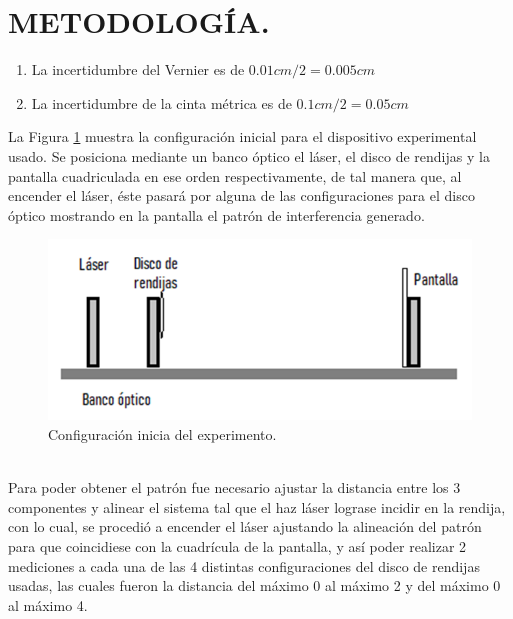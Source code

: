 \documentclass[12pt,a4paper]{article}
\begin{document}
\newpage
\section{METODOLOGÍA.} %
\begin{enumerate}[noitemsep]
	\item La incertidumbre del Vernier es de $ 0.01cm/2=0.005 cm $
	\item La incertidumbre de la cinta métrica es de $ 0.1cm/2=0.05 cm $
\end{enumerate}
La Figura \ref{fig:conf_inicial} muestra la configuración inicial para el dispositivo experimental usado.
Se posiciona mediante un banco óptico el láser, el disco de rendijas y la pantalla cuadriculada en ese orden respectivamente, de tal manera que, al encender el láser, éste pasará por alguna de las configuraciones para el disco óptico mostrando en la pantalla el patrón de interferencia generado.
\begin{figure}[hbtp!]
	\centering
	\includegraphics[width= 0.7 \linewidth]{2_METODO/image}
	\caption{Configuración inicia del experimento.}
	\label{fig:conf_inicial}
\end{figure}\\
Para poder obtener el patrón fue necesario ajustar la distancia entre los 3 componentes y alinear el sistema tal que el haz láser lograse incidir en la rendija, con lo cual, se procedió a encender el láser ajustando la alineación del patrón para que coincidiese con la cuadrícula de la pantalla, y así poder realizar 2 mediciones a cada una de las 4 distintas configuraciones del disco de rendijas usadas, las cuales fueron la distancia del máximo 0 al máximo 2 y del máximo 0 al máximo 4.
\end{document}
